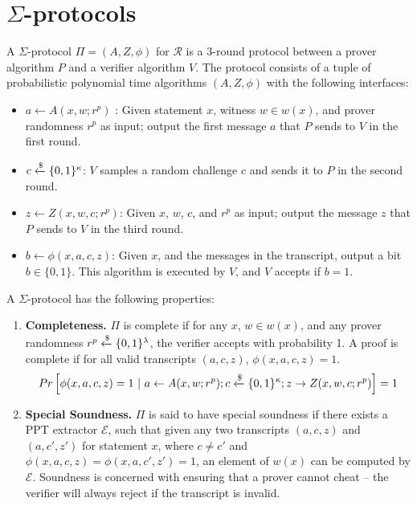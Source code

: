 \section{$\Sigma$-protocols}
\begin{definition}\label{def:sigma}
A $\Sigma$-protocol $\Pi = (A, Z, \phi)$ for $\mathcal R$ is a 3-round protocol between a prover algorithm $P$ and a verifier algorithm $V$. The protocol consists of a tuple of probabilistic polynomial time algorithms $(A, Z, \phi)$ with the following interfaces:
\begin{itemize}
    \item $a \leftarrow A(x,w; r^p)$ : Given statement $x$, witness $w \in w(x)$, and prover randomness $r^p$ as input; output the first message $a$ that $P$ sends to $V$ in the first round. 
    \item $c \xleftarrow{\$} \{0,1\}^\kappa$: $V$ samples a random challenge $c$ and sends it to $P$ in the second round. 
    \item $z \leftarrow Z(x,w,c; r^p)$: Given $x$, $w$, $c$, and $r^p$ as input; output the message $z$ that $P$ sends to $V$ in the third round.
    \item $b \leftarrow \phi(x,a,c,z)$: Given $x$, and the messages in the transcript, output a bit $b \in \{0,1\}$. This algorithm is executed by $V$, and $V$ accepts if $b = 1$.
\end{itemize}
A $\Sigma$-protocol has the following properties:
\begin{enumerate}
    \item \textbf{Completeness.} $\Pi$ is complete if for any $x$, $w \in w(x)$, and any prover randomness 
    $r^p \xleftarrow{\$} \{0,1\}^\lambda$, the verifier accepts with probability 1. A proof is complete if for all valid 
    transcripts $(a,c,z)$, $\phi(x,a,c,z) = 1$.
    $$
    \begin{gathered}
        Pr\left[\phi(x,a,c,z) = 1 \ \vert\  a \leftarrow A(x,w;r^p); c\xleftarrow{\$} \{0,1\}^\kappa; z \rightarrow Z(x,w,c;r^p)\right] = 1
    \end{gathered}
    $$
    \item \textbf{Special Soundness.} $\Pi$ is said to have special soundness if there exists a PPT extractor 
    $\mathcal E$, such that given any two transcripts $(a,c,z)$ and $(a,c',z')$ for statement $x$, where $c \ne c'$ 
    and $\phi(x,a,c,z) = \phi(x,a,c',z') = 1$, an element of $w(x)$ can be computed by $\mathcal E$. Soundness is concerned 
    with ensuring that a prover cannot cheat -- the verifier will always reject if the transcript is invalid.

\end{enumerate}
\end{definition}

